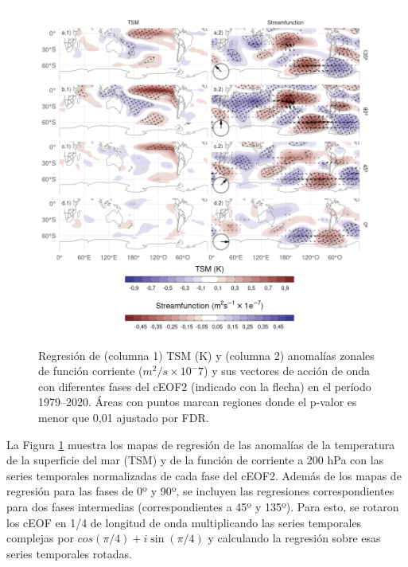 \documentclass[12pt,oneside,a4paper]{reedthesis}
\begin{document}
\begin{figure}

{\centering \includegraphics{figures/20-ceofs/sst-psi-2-1} 

}

\caption{Regresión de (columna 1) TSM (K) y (columna 2) anomalías zonales de función corriente (\(m^2/s\times10^-7\)) y sus vectores de acción de onda con diferentes fases del cEOF2 (indicado con la flecha) en el período 1979--2020. Áreas con puntos marcan regiones donde el p-valor es menor que 0,01 ajustado por FDR.}\label{fig:sst-psi-2}
\end{figure}

La Figura \ref{fig:sst-psi-2} muestra los mapas de regresión de las anomalías de la temperatura de la superficie del mar (TSM) y de la función de corriente a 200 hPa con las series temporales normalizadas de cada fase del cEOF2.
Además de los mapas de regresión para las fases de 0º y 90º, se incluyen las regresiones correspondientes para dos fases intermedias (correspondientes a 45º y 135º).
Para esto, se rotaron los cEOF en 1/4 de longitud de onda multiplicando las series temporales complejas por \(cos(\pi/4) + i\sin(\pi/4)\) y calculando la regresión sobre esas series temporales rotadas.
\end{document}
